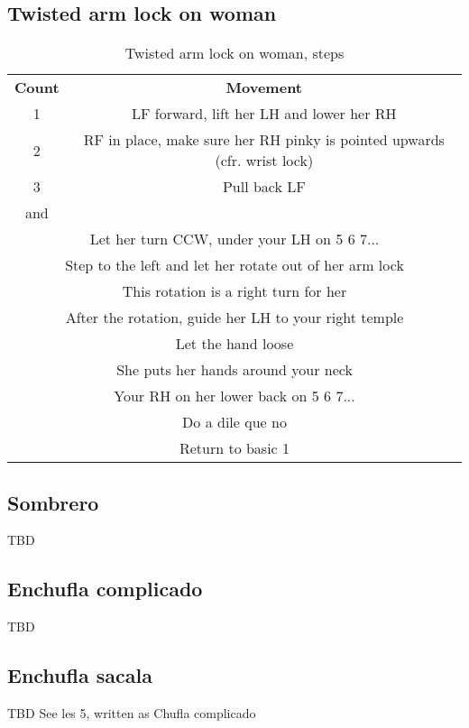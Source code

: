 \subsection{Twisted arm lock on woman}
\begin{table}[H]
\centering
\begin{tabular}{cc}
  \toprule
  \textbf{Count} & \textbf{Movement}\\
  \cmidrule(lr){1-1}\cmidrule(lr){2-2}
  1 & LF forward, lift her LH and lower her RH\\
  2 & RF in place, make sure her RH pinky is pointed upwards (cfr. wrist lock)\\
  3 & Pull back LF\\
  and &\\
  \multicolumn{2}{c}{Let her turn CCW, under your LH on 5 6 7...}\\
  \multicolumn{2}{c}{Step to the left and let her rotate out of her arm lock}\\
  \multicolumn{2}{c}{This rotation is a right turn for her}\\
  \multicolumn{2}{c}{After the rotation, guide her LH to your right temple}\\
  \multicolumn{2}{c}{Let the hand loose}\\
  \multicolumn{2}{c}{She puts her hands around your neck}\\
  \multicolumn{2}{c}{Your RH on her lower back on 5 6 7...}\\
  \multicolumn{2}{c}{Do a dile que no}\\
  \multicolumn{2}{c}{Return to basic 1}\\
  \bottomrule
\end{tabular}
\label{twisted_arm_lock_steps}
\caption{Twisted arm lock on woman, steps}
\end{table}

\subsection{Sombrero}
TBD

\subsection{Enchufla complicado}
TBD

\subsection{Enchufla sacala}
TBD
See les 5, written as Chufla complicado

